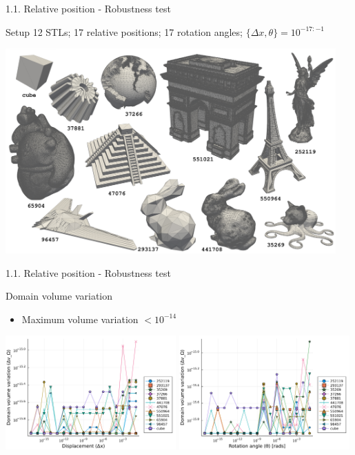 \documentclass{beamer}
\begin{document}
\begin{frame}{1.1. Relative position - Robustness test}
  \begin{block}{Setup}
    12 STLs; 17 relative positions; 17 rotation angles;  $\{\Delta x, \theta\} = 10^{-17:-1}$
  \end{block}
  \includegraphics[width=0.95\textwidth]{matrix_ids.pdf}
\end{frame}



\begin{frame}{1.1. Relative position - Robustness test}

  \begin{block}{Domain volume variation}
  \begin{itemize}
    \item
      Maximum volume variation $< 10^{-14}$
  \end{itemize}
  \end{block}

  \includegraphics[width=0.49\textwidth]{../analysis/plots/x_displacement_y_domain_volume}
  \includegraphics[width=0.49\textwidth]{../analysis/plots/x_rotation_y_domain_volume}
\end{frame}
\end{document}
